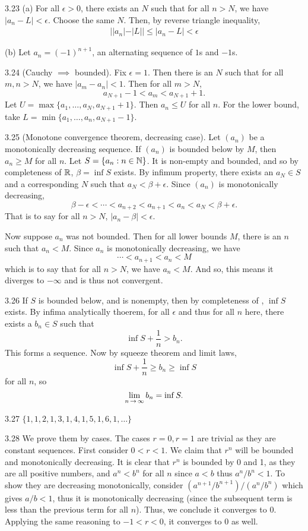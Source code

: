 3.23 (a) For all $\epsilon > 0$, there exists an $N$ such that for all $n > N$, we have $|a_n - L| < \epsilon$.
Choose the same $N$. Then, by reverse triangle inequality,
\begin{align}
    ||a_n| - |L|| \leq |a_n - L| < \epsilon
\end{align}

(b) Let $a_n = {(-1)}^{n+1}$, an alternating sequence of $1$s and $-1$s.

3.24 (Cauchy $\implies$ bounded). Fix $\epsilon = 1$. Then there is an $N$ such that for all $m,n > N$, we have $|a_m - a_n| < 1$. Then for all $m > N$,
\[ a_{N+1} - 1 < a_m < a_{N+1} + 1.\] Let $U= \max\{ a_1, \ldots, a_N, a_{N+1} + 1 \}$. Then $a_n \leq U$ for all $n$. For the lower bound, take $L = \min \{ a_1, \ldots, a_n, a_{N+1}-1\}$.

3.25 (Monotone convergence theorem, decreasing case). Let $(a_n)$ be a monotonically decreasing sequence. If $(a_n)$ is bounded below by $M$, then $a_n \geq M$ for all $n$.
Let $S=\{a_n : n \in \mathbb{N}\}$. It is non-empty and bounded, and so by completeness of $\mathbb{R}$,  $\beta = \inf S$ exists. By
infimum property, there exists an $a_N \in S$ and a corresponding $N$ such that $a_N < \beta + \epsilon$. Since $(a_n)$ is monotonically decreasing, \[\beta - \epsilon < \cdots < a_{n+2} < a_{n+1} < a_{n} < a_{N} < \beta + \epsilon.\] That is 
to say for all $n > N$, $|a_n - \beta| < \epsilon$.

Now suppose $a_n$ was not bounded. Then for all lower bounds $M$, there is an $n$ such that $a_n < M$. Since $a_n$ is monotonically decreasing, we have
\[\cdots < a_{n+1} < a_{n} < M\]
which is to say that for all $n > N$, we have $a_n < M$. And so, this means it diverges to $-\infty$ and is thus not convergent.

3.26 If $S$ is bounded below, and is nonempty, then by completeness of \R, $\inf S$ exists. By infima analytically thoerem, for all $\epsilon$ and thus for all $n$ here, there exists a $b_n \in S$ such that \[\inf S + \frac{1}{n} > b_n.\] This forms a sequence.
Now by squeeze theorem and limit laws, \[\inf S + \frac{1}{n} \geq b_n \geq \inf S\] for all $n$, so \[\lim_{n \,\rightarrow\, \infty}{b_n} = \inf S.\]

3.27 $\{1,1,2,1,3,1,4,1,5,1,6,1,\dots\}$

3.28 We prove them by cases. The cases $r=0, r=1$ are trivial as they are constant sequences. First consider $0<r<1$. We claim that $r^n$ will be bounded and monotonically decreasing.  It is clear
that $r^n$ is bounded by 0 and 1, as they are all positive numbers, and $a^n < b^n$ for all $n$ since $a<b$ thus $a^n/b^n < 1$. To show they are decreasing monotonically, consider $(a^{n+1}/b^{n+1})/(a^n/b^n)$ which gives
$a/b<1$, thus it is monotonically decreasing (since the subsequent term is less than the previous term for all $n$). Thus, we conclude it converges to 0. Applying the same reasoning to $-1<r<0$, it converges to 0 as well.

